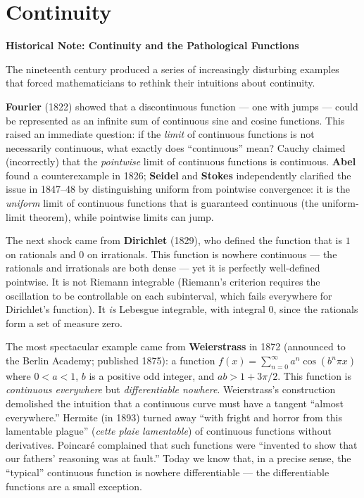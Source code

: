 \documentclass[12pt, openany]{book}
\theoremstyle{plain}
\theoremstyle{definition}
\theoremstyle{remark}
\begin{document}
\chapter{Continuity}
\color{black}

\begin{remarkbox}
\textbf{Historical Note: Continuity and the Pathological Functions}

The nineteenth century produced a series of increasingly disturbing examples that forced mathematicians to rethink their intuitions about continuity.

\textbf{Fourier} (1822) showed that a discontinuous function --- one with jumps --- could be represented as an infinite sum of continuous sine and cosine functions. This raised an immediate question: if the \emph{limit} of continuous functions is not necessarily continuous, what exactly does ``continuous'' mean? Cauchy claimed (incorrectly) that the \emph{pointwise} limit of continuous functions is continuous. \textbf{Abel} found a counterexample in 1826; \textbf{Seidel} and \textbf{Stokes} independently clarified the issue in 1847--48 by distinguishing uniform from pointwise convergence: it is the \emph{uniform} limit of continuous functions that is guaranteed continuous (the uniform-limit theorem), while pointwise limits can jump.

The next shock came from \textbf{Dirichlet} (1829), who defined the function that is $1$ on rationals and $0$ on irrationals. This function is nowhere continuous --- the rationals and irrationals are both dense --- yet it is perfectly well-defined pointwise. It is not Riemann integrable (Riemann's criterion requires the oscillation to be controllable on each subinterval, which fails everywhere for Dirichlet's function). It \emph{is} Lebesgue integrable, with integral $0$, since the rationals form a set of measure zero.

The most spectacular example came from \textbf{Weierstrass} in 1872 (announced to the Berlin Academy; published 1875): a function $f(x) = \sum_{n=0}^\infty a^n \cos(b^n \pi x)$ where $0 < a < 1$, $b$ is a positive odd integer, and $ab > 1 + 3\pi/2$. This function is \emph{continuous everywhere} but \emph{differentiable nowhere}. Weierstrass's construction demolished the intuition that a continuous curve must have a tangent ``almost everywhere.'' Hermite (in 1893) turned away ``with fright and horror from this lamentable plague'' (\emph{cette plaie lamentable}) of continuous functions without derivatives. Poincar\'{e} complained that such functions were ``invented to show that our fathers' reasoning was at fault.'' Today we know that, in a precise sense, the ``typical'' continuous function is nowhere differentiable --- the differentiable functions are a small exception.


\end{remarkbox}
\end{document}
